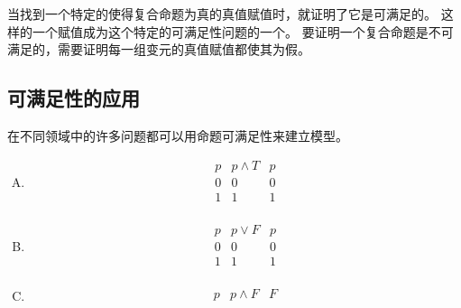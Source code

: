 {{        当找到一个特定的使得复合命题为真的真值赋值时，就证明了它是可满足的。
        这样的一个赋值成为这个特定的可满足性问题的一个。
        要证明一个复合命题是不可满足的，需要证明每一组变元的真值赋值都使其为假。
    }

    \subsection{可满足性的应用}
    {
        在不同领域中的许多问题都可以用命题可满足性来建立模型。
    }

    \begin{practices}
        \begin{enumerate}[A.]
            \item
            {
                \begin{table}[H]
                    \[
                        \begin{array}{c|c|c}
                            \hline
                            p & p \wedge T & p \\
                            \hline
                            0 & 0 & 0 \\
                            1 & 1 & 1 \\
                        \end{array}
                    \]
                \end{table}
            }
            \item
            {
                \begin{table}[H]
                    \[
                        \begin{array}{c|c|c}
                            \hline
                            p & p \vee F & p \\
                            \hline
                            0 & 0 & 0 \\
                            1 & 1 & 1 \\
                        \end{array}
                    \]
                \end{table}
            }
            \item
            {
                \begin{table}[H]
                    \[
                        \begin{array}{c|c|c}
                            \hline
                            p & p \wedge F & F \\

\end{array}\]
\end{table}}
\end{enumerate}
\end{practices}}
